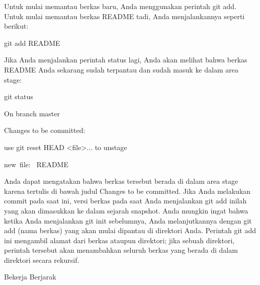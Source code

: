  \par
\noindent 
{\fontsize{14pt}{14pt}\selectfont Untuk mulai memantau berkas baru, Anda menggunakan perintah $  $git add. Untuk mulai memantau berkas README tadi, Anda menjalankannya seperti berikut: \\} \par
\noindent 
{\fontsize{14pt}{14pt}\selectfont git add README \\} \par
\noindent 
{\fontsize{14pt}{14pt}\selectfont Jika Anda menjalankan perintah $  $status $  $lagi, Anda akan melihat bahwa berkas README Anda sekarang sudah terpantau dan sudah masuk ke dalam area stage: \\} \par
\noindent 
{\fontsize{14pt}{14pt}\selectfont git status \\} \par
\noindent 
{\fontsize{14pt}{14pt}\selectfont On branch master \\} \par
\noindent 
{\fontsize{14pt}{14pt}\selectfont Changes to be committed: \\} \par
\noindent 
{\fontsize{14pt}{14pt}\selectfont use git reset HEAD <file>... to unstage \\} \par
\noindent 
{\fontsize{14pt}{14pt}\selectfont new~file:~  README \\} \par
\noindent 
{\fontsize{14pt}{14pt}\selectfont Anda dapat mengatakan bahwa berkas tersebut berada di dalam area stage karena tertulis di bawah judul Changes to be committed. Jika Anda melakukan commit pada saat ini, versi berkas pada saat Anda menjalankan $  $git add $  $inilah yang akan dimasukkan ke dalam sejarah snapshot. Anda mungkin ingat bahwa ketika Anda menjalankan $  $git init $  $sebelumnya, Anda melanjutkannya dengan $  $git add (nama berkas) $  $yang akan mulai dipantau di direktori Anda. Perintah $  $git add $  $ini mengambil alamat dari berkas ataupun direktori; jika sebuah direktori, perintah tersebut akan menambahkan seluruh berkas yang berada di dalam direktori secara rekursif. \\} \par
\vspace{14pt}
\vspace{14pt}
\noindent 
{\fontsize{14pt}{14pt}\selectfont Bekerja Berjarak \\} \par
